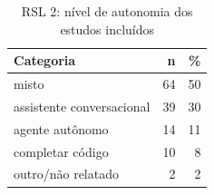 \begin{table}[htbp]
\centering
\caption{RSL 2: nível de autonomia dos estudos incluídos}
\label{tab:map-rsl2-nveldeautono}
\small
\begin{tabular}{p{8cm}rr}
\hline
\textbf{Categoria} & \textbf{n} & \textbf{\%} \\
\hline
misto & 64 & 50 \\
assistente conversacional & 39 & 30 \\
agente autônomo & 14 & 11 \\
completar código & 10 & 8 \\
outro/não relatado & 2 & 2 \\
\hline
\end{tabular}
\end{table}
